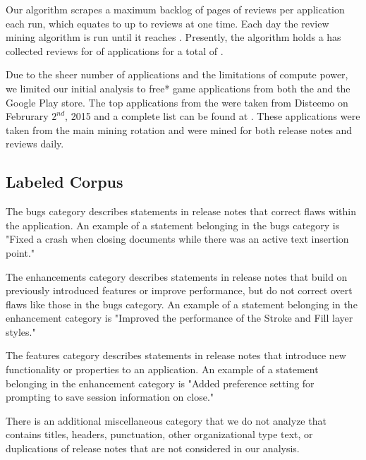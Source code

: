 \documentclass{acm_proc_article-sp}
\begin{document}
Our algorithm scrapes a maximum backlog of \RVperDay pages of reviews per application each run, which equates to up to \RVnumDaily reviews at one time. 
Each day the review mining algorithm is run until it reaches \RVpagesperDay.
Presently, the algorithm holds a has collected reviews for of \RVTotalApps applications for a total of \RVTotalRevs.

Due to the sheer number of applications and the limitations of compute power, we limited our initial analysis to \minicorpSize free* game applications from both the \ias and the Google Play store.
The top applications from the \ias were taken from Disteemo on Februrary $2^{nd}$, 2015 and a complete list can be found at .
These applications were taken from the main mining rotation and were mined for both release notes and reviews daily.


\subsection{Labeled Corpus}


The bugs category describes statements in release notes that correct flaws within the application.
An example of a statement belonging in the bugs category is "Fixed a crash when closing documents while there was an active text insertion point."

The enhancements category describes statements in release notes that build on previously introduced features or improve performance, but do not correct overt flaws like those in the bugs category. 
An example of a statement belonging in the enhancement category is "Improved the performance of the Stroke and Fill layer styles."

The features category describes statements in release notes that  introduce new functionality or properties to an application.
An example of a statement belonging in the enhancement category is "Added preference setting for prompting to save session information on close."

There is an additional miscellaneous category that we do not analyze that contains titles, headers, punctuation, other organizational type text, or duplications of release notes that are not considered in our analysis.
\end{document}
